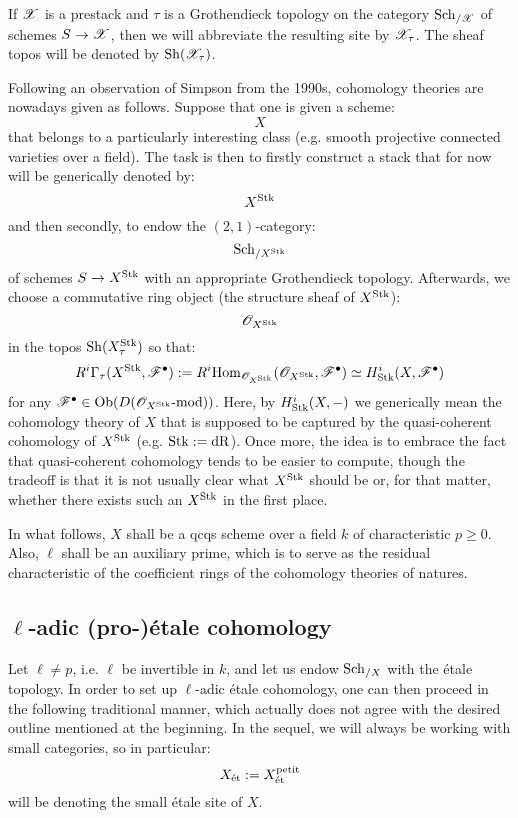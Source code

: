             \begin{convention}
                If $\mathscr{X}$ is a prestack and $\tau$ is a Grothendieck topology on the category $\mathrm{Sch}_{/\mathscr{X}}$ of schemes $S \to \mathscr{X}$, then we will abbreviate the resulting site by $\mathscr{X}_{\tau}$. The sheaf topos will be denoted by $\mathrm{Sh}(\mathscr{X}_{\tau})$.
            \end{convention}
            
            Following an observation of Simpson from the 1990s, cohomology theories are nowadays given as follows. Suppose that one is given a scheme:
                $$X$$
            that belongs to a particularly interesting class (e.g. smooth projective connected varieties over a field). The task is then to firstly construct a stack that for now will be generically denoted by:
                $$X^{\mathrm{Stk}}$$
            and then secondly, to endow the $(2, 1)$-category:
                $$\mathrm{Sch}_{/X^{\mathrm{Stk}}}$$
            of schemes $S \to X^{\mathrm{Stk}}$ with an appropriate Grothendieck topology. Afterwards, we choose a commutative ring object (the structure sheaf of $X^{\mathrm{Stk}}$):
                $$\mathscr{O}_{X^{\mathrm{Stk}}}$$
            in the topos $\mathrm{Sh}(X^{\mathrm{Stk}}_{\tau})$ so that:
                $$R^i\Gamma_{\tau}(X^{\mathrm{Stk}}, \mathscr{F}^{\bullet}) := R^i\mathrm{Hom}_{\mathscr{O}_{X^{\mathrm{Stk}}}}(\mathscr{O}_{X^{\mathrm{Stk}}}, \mathscr{F}^{\bullet}) \simeq H^i_{\mathrm{Stk}}(X, \mathscr{F}^{\bullet})$$
            for any $\mathscr{F}^{\bullet} \in \mathrm{Ob}( D(\mathscr{O}_{X^{\mathrm{Stk}}}\text{-}\mathrm{mod}) )$. Here, by $H^i_{\mathrm{Stk}}(X, -)$ we generically mean the cohomology theory of $X$ that is supposed to be captured by the quasi-coherent cohomology of $X^{\mathrm{Stk}}$ (e.g. $\mathrm{Stk} := \mathrm{dR}$). Once more, the idea is to embrace the fact that quasi-coherent cohomology tends to be easier to compute, though the tradeoff is that it is not usually clear what $X^{\mathrm{Stk}}$ should be or, for that matter, whether there exists such an $X^{\mathrm{Stk}}$ in the first place. 
            
            \begin{convention}
                In what follows, $X$ shall be a qcqs scheme over a field $k$ of characteristic $p \geq 0$. Also, $\ell$ shall be an auxiliary prime, which is to serve as the residual characteristic of the coefficient rings of the cohomology theories of  natures.
            \end{convention}
    
        \subsection{\texorpdfstring{$\ell$}{}-adic (pro-)\'etale cohomology}
            Let $\ell \not = p$, i.e. $\ell$ be invertible in $k$, and let us endow $\mathrm{Sch}_{/X}$ with the \'etale topology. In order to set up $\ell$-adic \'etale cohomology, one can then proceed in the following traditional manner, which actually does not agree with the desired outline mentioned at the beginning. In the sequel, we will always be working with small categories, so in particular:
                $$X_{\mathrm{\acute{e}t}} := X_{\mathrm{\acute{e}t}}^{\mathrm{petit}}$$
            will be denoting the small \'etale site of $X$. 

